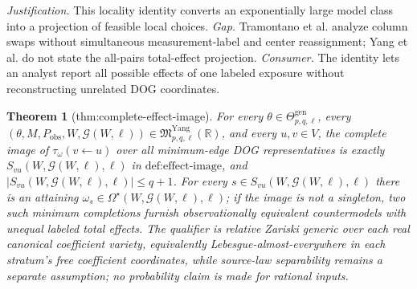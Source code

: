 \documentclass{article}
\newtheorem{theorem}{Theorem}
\begin{document}
\par\smallskip\noindent \textit{Justification.} This locality identity converts an exponentially large model class into a projection of feasible local choices. \textit{Gap.} Tramontano et al. analyze column swaps without simultaneous measurement-label and center reassignment; Yang et al. do not state the all-pairs total-effect projection. \textit{Consumer.} The identity lets an analyst report all possible effects of one labeled exposure without reconstructing unrelated DOG coordinates.

\begin{theorem}[thm:complete-effect-image]\label{thm:complete-effect-image}
For every \(\theta\in\Theta_{p,q,\ell}^{\mathrm{gen}}\), every \((\theta,M,P_{\mathrm{obs}},W,\mathcal G(W,\ell))\in\mathfrak M_{p,q,\ell}^{\mathrm{Yang}}(\mathbb R)\), and every \(u,v\in V\), the complete image of \(\tau_{\omega}(v\leftarrow u)\) over all minimum-edge DOG representatives is exactly \(S_{vu}(W,\mathcal G(W,\ell),\ell)\) in \(\text{def:effect-image}\), and \(|S_{vu}(W,\mathcal G(W,\ell),\ell)|\leq q+1\). For every \(s\in S_{vu}(W,\mathcal G(W,\ell),\ell)\) there is an attaining \(\omega_s\in\Omega^{\star}(W,\mathcal G(W,\ell),\ell)\); if the image is not a singleton, two such minimum completions furnish observationally equivalent countermodels with unequal labeled total effects. The qualifier is relative Zariski generic over each real canonical coefficient variety, equivalently Lebesgue-almost-everywhere in each stratum's free coefficient coordinates, while source-law separability remains a separate assumption; no probability claim is made for rational inputs.
\end{theorem}
\end{document}
